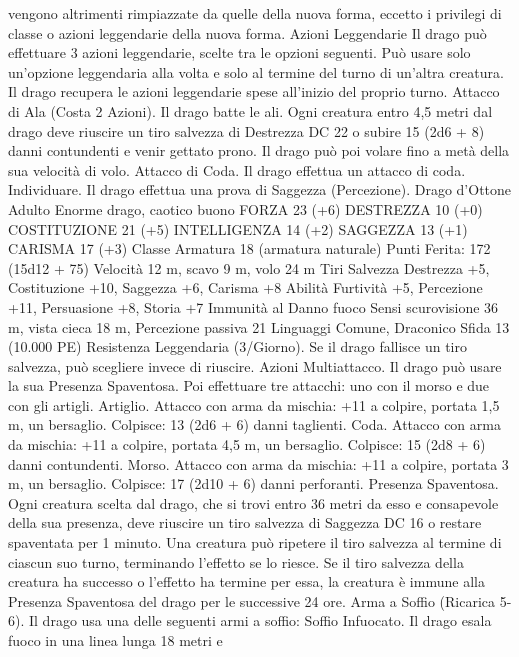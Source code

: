 \begin{multicols}{2}
vengono altrimenti rimpiazzate da quelle della nuova forma, eccetto i
privilegi di classe o azioni leggendarie della nuova forma.
Azioni Leggendarie
Il drago può effettuare 3 azioni leggendarie, scelte tra le opzioni
seguenti. Può usare solo un’opzione leggendaria alla volta e solo
al termine del turno di un’altra creatura. Il drago recupera le
azioni leggendarie spese all’inizio del proprio turno.
Attacco di Ala (Costa 2 Azioni). Il drago batte le ali. Ogni
creatura entro 4,5 metri dal drago deve riuscire un tiro salvezza
di Destrezza DC 22 o subire 15 (2d6 + 8) danni contundenti e
venir gettato prono. Il drago può poi volare fino a metà della sua
velocità di volo.
Attacco di Coda. Il drago effettua un attacco di coda.
Individuare. Il drago effettua una prova di Saggezza
(Percezione).
Drago d’Ottone Adulto
Enorme drago, caotico buono
FORZA 23 (+6)
DESTREZZA 10 (+0)
COSTITUZIONE 21 (+5)
INTELLIGENZA 14 (+2)
SAGGEZZA 13 (+1)
CARISMA 17 (+3)
Classe Armatura 18 (armatura naturale)
\hspace*{0pt}\hfill{Punti Ferita}: 172 (15d12 + 75)
Velocità 12 m, scavo 9 m, volo 24 m
Tiri Salvezza Destrezza +5, Costituzione +10, Saggezza +6,
Carisma +8
Abilità Furtività +5, Percezione +11, Persuasione +8, Storia +7
Immunità al Danno fuoco
Sensi scurovisione 36 m, vista cieca 18 m, Percezione passiva 21
Linguaggi Comune, Draconico
Sfida 13 (10.000 PE)
Resistenza Leggendaria (3/Giorno). Se il drago fallisce un tiro
salvezza, può scegliere invece di riuscire.
Azioni
Multiattacco. Il drago può usare la sua Presenza Spaventosa. Poi
effettuare tre attacchi: uno con il morso e due con gli artigli.
Artiglio. Attacco con arma da mischia: +11 a colpire, portata 1,5
m, un bersaglio.
Colpisce: 13 (2d6 + 6) danni taglienti.
Coda. Attacco con arma da mischia: +11 a colpire, portata 4,5
m, un bersaglio.
Colpisce: 15 (2d8 + 6) danni contundenti.
Morso. Attacco con arma da mischia: +11 a colpire, portata 3 m,
un bersaglio.
Colpisce: 17 (2d10 + 6) danni perforanti.
Presenza Spaventosa. Ogni creatura scelta dal drago, che si trovi
entro 36 metri da esso e consapevole della sua presenza, deve
riuscire un tiro salvezza di Saggezza DC 16 o restare spaventata per
1 minuto. Una creatura può ripetere il tiro salvezza al termine di
ciascun suo turno, terminando l’effetto se lo riesce. Se il tiro salvezza
della creatura ha successo o l’effetto ha termine per essa, la creatura è
immune alla Presenza Spaventosa del drago per le successive 24 ore.
Arma a Soffio (Ricarica 5-6). Il drago usa una delle seguenti armi
a soffio:
Soffio Infuocato. Il drago esala fuoco in una linea lunga 18 metri e

\end{multicols}
